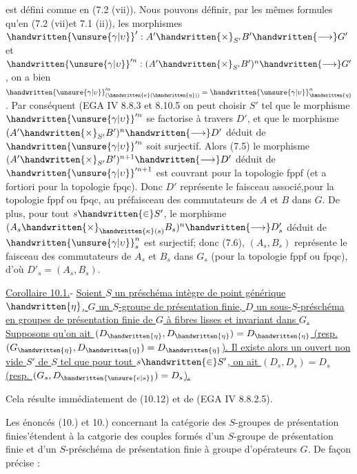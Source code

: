 est défini comme en (7.2 (vii)). Nous pouvons définir, par les mêmes formules qu'en (7.2 (vii)et 7.1 (ii)), les morphismes $\handwritten{\unsure{\gamma|\upsilon}}':A'\handwritten{\times}_{S'}B'\handwritten{\longrightarrow}G'$ et $\handwritten{\unsure{\gamma|\upsilon}}'^n:(A'\handwritten{\times}_{S'}B')^n\handwritten{\longrightarrow}G'$, on a bien $\handwritten{\unsure{\gamma|\upsilon}}'^n_{(\handwritten{\kappa}(\handwritten{\eta}))}=\handwritten{\unsure{\gamma|\upsilon}}^n_{\handwritten{\eta}}$. Par conséquent (EGA IV 8.8.3 et 8.10.5\deleted{)}\handwritten{,} on peut choisir $S'$ tel que le morphisme $\handwritten{\unsure{\gamma|\upsilon}}'^n$ se factorise à travers $D'$, et que le morphisme $(A'\handwritten{\times}_{S'}B')^n\handwritten{\longrightarrow}D'$ déduit de $\handwritten{\unsure{\gamma|\upsilon}}'^n$ soit surjectif. Alors (7.5) le morphisme $(A'\handwritten{\times}_{S'}B')^{n+1}\handwritten{\longrightarrow}D'$ déduit de $\handwritten{\unsure{\gamma|\upsilon}}'^{n+1}$ est couvrant pour la topologie fppf (et a fortiori pour la topologie fpqc). Donc $D'$ représente le faisceau associé,pour la topologie fppf ou fpqc, au préfaisceau des commutateurs de $A$ et $B$ dans $G$. De plus, pour tout $s\handwritten{\in}S'$, le morphisme $(A_s\handwritten{\times}_{\handwritten{\kappa}(s)}B_s)^n\handwritten{\longrightarrow}D'_s$ déduit de $\handwritten{\unsure{\gamma|\upsilon}}^n_s$ est surjectif; donc (7.6), $(A_s,B_s)$ représente le faisceau des commutateurs de $A_s$ et $B_s$ dans $G_s$ (pour la topologie fppf ou fpqc), d'où $D'_s=(A_s,B_s)$.

\uline{Corollaire 10.1.}- \uline{Soient $S$ un préschéma intègre de point générique $\handwritten{\eta}$, $G$ un $S$-groupe de présentation finie, $D$ un sous-$S$-préschéma en groupes de présentation finie de $G$ à fibres lisses et invariant dans $G$. Supposons qu'on ait $(D_{\handwritten{\eta}},D_{\handwritten{\eta}})=D_{\handwritten{\eta}}$ (resp. $(G_{\handwritten{\eta}},D_{\handwritten{\eta}})=D_{\handwritten{\eta}}$). Il existe alors un ouvert non vide $S'$ de $S$ tel que pour tout $s\handwritten{\in}S'$, on ait $(D_s,D_s)=D_s$ (resp. $(G_s,D_{\handwritten{\unsure{e|s}}})=D_s$).}

Cela résulte immédiatement de (10.12) et de (EGA IV 8.8.2.5).

Les énoncés (10.) et \inserted{\handwritten{(}}10.) concernant la catégorie des $S$-groupes de présentation finie\handwritten{[}s'étendent à la catgorie des couples formés d'un $S$-groupe de présentation finie et d'un  $S$-préschéma de présentation finie à groupe d'opérateurs $G$. De façon précise :

